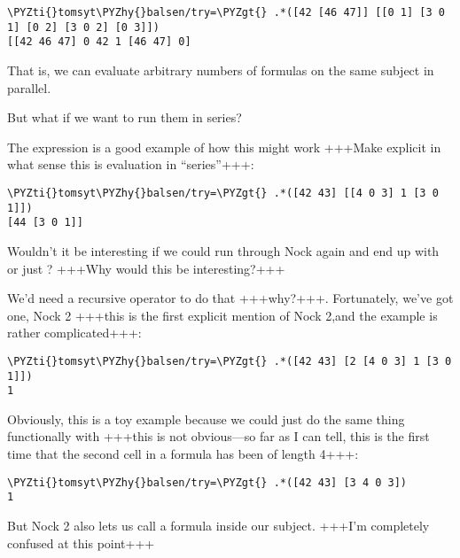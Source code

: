 \begin{framed_shaded}
\begin{Verbatim}[fontsize=\relsize{-2.5},commandchars=\\\{\}]
\PYZti{}tomsyt\PYZhy{}balsen/try=\PYZgt{} .*([42 [46 47]] [[0 1] [3 0 1] [0 2] [3 0 2] [0 3]])
[[42 46 47] 0 42 1 [46 47] 0]
\end{Verbatim}
\end{framed_shaded}

That is, we can evaluate arbitrary numbers of formulas on the same subject in
parallel.

But what if we want to run them in series?

The expression \kode{*[[42 43] [[4 0 3] 1 [0 1]]]} is a good example of how this might work +++Make explicit in what sense this is evaluation in ``series''+++:

\begin{framed_shaded}
\begin{Verbatim}[fontsize=\relsize{-2.5},commandchars=\\\{\}]
\PYZti{}tomsyt\PYZhy{}balsen/try=\PYZgt{} .*([42 43] [[4 0 3] 1 [3 0 1]])
[44 [3 0 1]]
\end{Verbatim}
\end{framed_shaded}

Wouldn't it be interesting if we could run \kode{[44 [3 0 1]]} through Nock again and end up with \kode{*[44 [3 0 1]]} or just ? +++Why would this be interesting?+++

We'd need a recursive operator to do that +++why?+++. Fortunately, we've got one, Nock 2 +++this is the first explicit mention of Nock 2,and the example is rather complicated+++:

\begin{framed_shaded}
\begin{Verbatim}[fontsize=\relsize{-2.5},commandchars=\\\{\}]
\PYZti{}tomsyt\PYZhy{}balsen/try=\PYZgt{} .*([42 43] [2 [4 0 3] 1 [3 0 1]])
1
\end{Verbatim}
\end{framed_shaded}
Obviously, this is a toy example because we could just do the same thing
functionally with +++this is not obvious—so far as I can tell, this is the first time that the second cell in a formula has been of length 4+++:

\begin{framed_shaded}
\begin{Verbatim}[fontsize=\relsize{-2.5},commandchars=\\\{\}]
\PYZti{}tomsyt\PYZhy{}balsen/try=\PYZgt{} .*([42 43] [3 4 0 3])
1
\end{Verbatim}
\end{framed_shaded}
But Nock 2 also lets us call a formula inside our subject. +++I'm completely confused at this point+++

